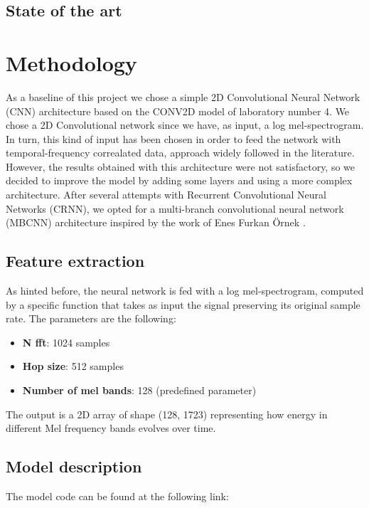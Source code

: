 \documentclass{article}
\begin{document}
\begin{sloppy}
\subsection{State of the art}
\label{sec:state_of_the_art}


\section{Methodology}
\label{sec:methodology}
As a baseline of this project we chose a simple 2D Convolutional Neural Network (CNN) architecture based on the CONV2D model of laboratory number 4.
We chose a 2D Convolutional network since we have, as input, a log mel-spectrogram. In turn, this kind of input has been chosen in order to feed the network with
temporal-frequency correalated data, approach widely followed in the literature. However, the results obtained with this architecture were not satisfactory,
so we decided to improve the model by adding some layers and using a more complex architecture. After several attempts with Recurrent Convolutional Neural Networks (CRNN),
we opted for a multi-branch convolutional neural network (MBCNN) architecture inspired by the work of Enes Furkan Örnek \cite{audio_classification_esc50, latifi2025classificationheartsoundsusing}.

\subsection{Feature extraction}
\label{sec:feature_extraction}
As hinted before, the neural network is fed with a log mel-spectrogram, computed by a specific function that takes as input
the signal preserving its original sample rate. The parameters are the following:
\begin{itemize}
    \item \textbf{N fft}: 1024 samples
    \item \textbf{Hop size}: 512 samples
    \item \textbf{Number of mel bands}: 128 (predefined parameter)
\end{itemize}
The output is a 2D array of shape (128, 1723) representing how energy in different Mel frequency bands evolves over time.

\subsection{Model description}
\label{sec:model_description}
The model code can be found at the following link:


\end{sloppy}
\end{document}
